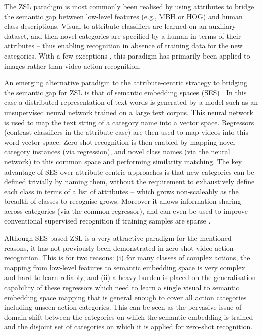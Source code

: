 \documentclass{article}
\begin{document}
The ZSL paradigm is most commonly been realised by using attributes \cite{lampert2013attributeZSL} to bridge the semantic gap between low-level features (e.g., MBH or HOG) and human class descriptions. Visual to attribute classifiers are learned on an auxiliary dataset, and then novel categories are specified by a human in terms of their attributes -- thus enabling recognition in absence of training data for the new categories. With a few exceptions \cite{Liu2011,Fu2014_PAMI}, this paradigm has primarily been applied to images rather than video action recognition. 

An emerging alternative paradigm to the attribute-centric strategy to bridging the semantic gap for ZSL is that of semantic embedding spaces (SES) \cite{Socher2013,Fu2014a,Habibian2014}. In this case a distributed representation of text words is generated by a model such as an unsupervised neural network \cite{Mikolov2013} trained on a large text corpus. This neural network is used to map the text string of a category name into a vector space. Regressors (contrast classifiers in the attribute case) are then used to map videos into this word vector space. Zero-shot recognition is then enabled by mapping novel category instances (via regression), and novel class names (via the neural network) to this common space and performing similarity matching. The key advantage of SES over attribute-centric approaches is that new categories can be defined trivially by naming them, without the requirement to exhaustively define each class in terms of a list of attributes -- which grows non-scaleably as the breadth of classes to recognise grows. Moreover it allows information sharing across categories (via the common regressor), and can even be used to improve conventional supervised recognition if training samples are sparse \cite{Habibian2014}. 

Although SES-based ZSL is a very attractive paradigm for the mentioned reasons, it has not previously been demonstrated in zero-shot video action recognition. This is for two reasons: (i) for many classes of complex actions, the mapping from low-level features to semantic embedding space is very complex and hard to learn reliably, and (ii) a heavy burden is placed on the generalisation capability of these regressors which need to learn a single visual to semantic embedding space mapping that is general enough to cover all action categories including unseen action categories. This can be seen as the pervasive issue \cite{Fu2014a} of domain shift between the categories on which the semantic embedding is trained and the disjoint set of categories on which it is applied for zero-shot recognition.
\end{document}
